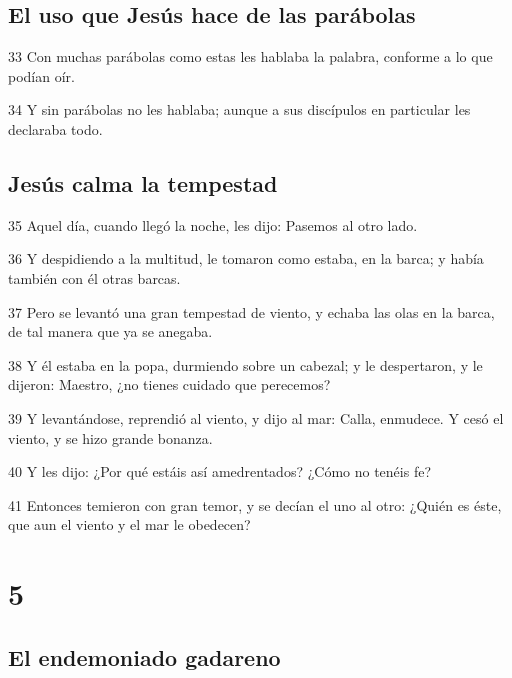 \section*{El uso que Jesús hace de las parábolas}

\par 33 Con muchas parábolas como estas les hablaba la palabra, conforme a lo que podían oír.
\par 34 Y sin parábolas no les hablaba; aunque a sus discípulos en particular les declaraba todo.

\section*{Jesús calma la tempestad}

\par 35 Aquel día, cuando llegó la noche, les dijo: Pasemos al otro lado.
\par 36 Y despidiendo a la multitud, le tomaron como estaba, en la barca; y había también con él otras barcas.
\par 37 Pero se levantó una gran tempestad de viento, y echaba las olas en la barca, de tal manera que ya se anegaba.
\par 38 Y él estaba en la popa, durmiendo sobre un cabezal; y le despertaron, y le dijeron: Maestro, ¿no tienes cuidado que perecemos?
\par 39 Y levantándose, reprendió al viento, y dijo al mar: Calla, enmudece. Y cesó el viento, y se hizo grande bonanza.
\par 40 Y les dijo: ¿Por qué estáis así amedrentados? ¿Cómo no tenéis fe?
\par 41 Entonces temieron con gran temor, y se decían el uno al otro: ¿Quién es éste, que aun el viento y el mar le obedecen?

\chapter{5}

\section*{El endemoniado gadareno}

